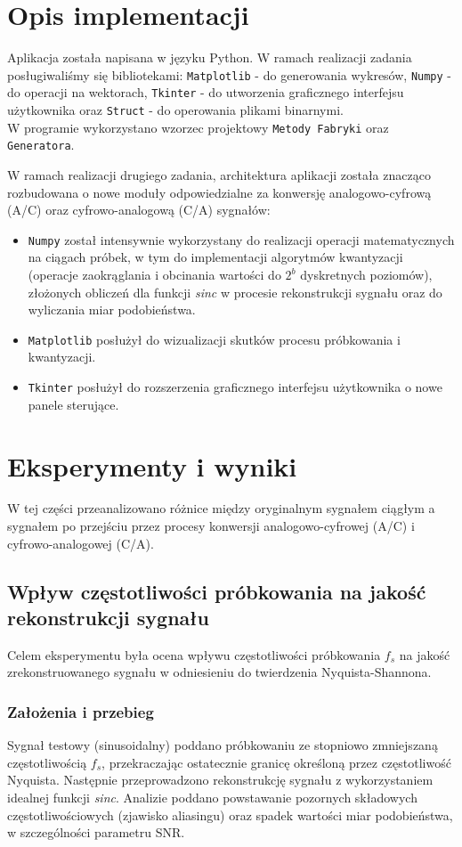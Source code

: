 \documentclass[12pt]{article}
\begin{document}
\section{Opis implementacji}
Aplikacja została napisana w języku Python. W ramach realizacji zadania posługiwaliśmy się bibliotekami: \verb|Matplotlib| - do generowania wykresów, \verb|Numpy| - do operacji na wektorach, \verb|Tkinter| - do utworzenia graficznego interfejsu użytkownika oraz \verb|Struct| - do operowania plikami binarnymi. \\
W programie wykorzystano wzorzec projektowy \verb|Metody Fabryki| oraz \verb|Generatora|.

W ramach realizacji drugiego zadania, architektura aplikacji została znacząco rozbudowana o nowe moduły odpowiedzialne za konwersję analogowo-cyfrową (A/C) oraz cyfrowo-analogową (C/A) sygnałów:

\begin{itemize}
	\item \verb|Numpy| został intensywnie wykorzystany do realizacji operacji matematycznych na ciągach próbek, w tym do implementacji algorytmów kwantyzacji (operacje zaokrąglania i obcinania wartości do $2^b$ dyskretnych poziomów), złożonych obliczeń dla funkcji \textit{sinc} w procesie rekonstrukcji sygnału oraz do wyliczania miar podobieństwa.
	\item \verb|Matplotlib| posłużył do wizualizacji skutków procesu próbkowania i kwantyzacji.
	\item \verb|Tkinter| posłużył do rozszerzenia graficznego interfejsu użytkownika o nowe panele sterujące.
\end{itemize}


\section{Eksperymenty i wyniki}
W tej części przeanalizowano różnice między oryginalnym sygnałem ciągłym a sygnałem po przejściu przez procesy konwersji analogowo-cyfrowej (A/C) i cyfrowo-analogowej (C/A).

\newpage
\subsection{Wpływ częstotliwości próbkowania na jakość rekonstrukcji sygnału}
Celem eksperymentu była ocena wpływu częstotliwości próbkowania $f_s$ na jakość zrekonstruowanego sygnału w odniesieniu do twierdzenia Nyquista-Shannona.

\subsubsection{Założenia i przebieg}
Sygnał testowy (sinusoidalny) poddano próbkowaniu ze stopniowo zmniejszaną częstotliwością $f_s$, przekraczając ostatecznie granicę określoną przez częstotliwość Nyquista. Następnie przeprowadzono rekonstrukcję sygnału z wykorzystaniem idealnej funkcji \textit{sinc}. Analizie poddano powstawanie pozornych składowych częstotliwościowych (zjawisko aliasingu) oraz spadek wartości miar podobieństwa, w szczególności parametru SNR.
\end{document}

